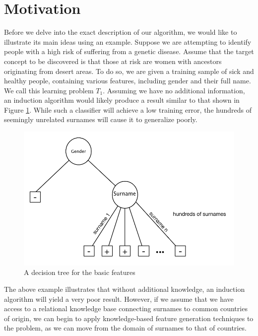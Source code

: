 \documentclass{article}
\theoremstyle{definition}
\begin{document}
\section{Motivation} \label{motivation}

Before we delve into the exact description of our algorithm, we would like to illustrate its main ideas using an example.
Suppose we are attempting to identify people with a high risk of suffering from a genetic disease. Assume that the target concept to be discovered is that those at risk are women with ancestors originating from desert areas. To do so, we are given a training sample of sick and healthy people, containing various features, including gender and their full name. We call this learning problem $T_1$.
Assuming we have no additional information, an induction algorithm would likely produce a result similar to that shown in Figure \ref{fig:tree_base}. While such a classifier will achieve a low training error, the hundreds of seemingly unrelated surnames will cause it to generalize poorly. %

\begin{figure}[h]
	\centering
	\includegraphics[width=0.8\linewidth]{fig1.pdf}
	\caption{A decision tree for the basic features}
	\label{fig:tree_base}
\end{figure}

The above example illustrates that without additional knowledge, an induction algorithm will yield a very poor result. %
However, if we assume that we have access to a relational knowledge base connecting surnames to common countries of origin, we can begin to apply knowledge-based feature generation techniques to the problem, as we can move from the domain of surnames to that of countries. 
\end{document}
